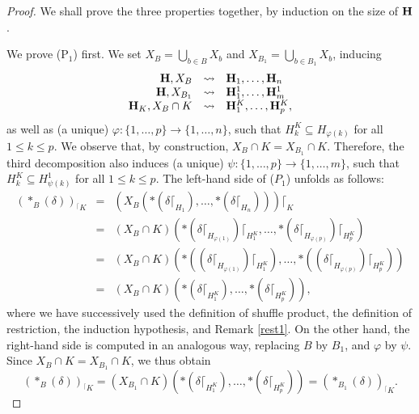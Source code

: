 \documentclass{article}
\theoremstyle{plain}
\theoremstyle{definition}
\newcommand{\inc}{\subseteq}
\newcommand{\Union}{\bigcup}
\newcommand{\set}[1]{\{#1\}}
\newcommand{\inter}{\cap}
\newcommand{\hyper}[1]{{\bf #1}}
\newcommand{\restrconstr}[2]{{#1}_{{}^\lceil {#2}}}
\begin{document}
\begin{proof} We shall prove   the three  properties   together, by induction on the size of ${\bf H}$.  

\smallskip

 We   prove  (P$_1$) first. We set $X_B=\Union_{b\in B}X_b$ and $X_{B_1}=\Union_{b\in B_1}X_b$, inducing
$$\begin{array}{rcl}

\hyper{H},X_B & \leadsto & \hyper{H}_1,\ldots,\hyper{H}_n\\ 
\hyper{H},X_{B_1} & \leadsto & \hyper{H}^1_1,\ldots,\hyper{H}^1_m \\
\hyper{H}_K,X_{B}\inter K & \leadsto &\hyper{H}_1^K,\ldots,\hyper{H}_p^K,
\end{array}$$
as well as (a unique) $\varphi:\set{1,\ldots,p}\rightarrow\set{1,\ldots,n}$, such that $H_k^K\inc H_{\varphi(k)}$ for all $1\leq k\leq p$. We observe that, by construction, $X_B\cap K=X_{B_1}\cap K$. Therefore, the third decomposition also induces (a unique) $\psi:\set{1,\ldots,p}\rightarrow\set{1,\ldots,m}$, such that $H_k^K\inc H^1_{\psi(k)}$ for all $1\leq k\leq p$. The left-hand side of ($P_1$) unfolds as follows:  
 $$\begin{array}{rcl}
\restrconstr{(\ast_B(\delta))}{K} & =&(X_ B(\ast(\delta\lceil_{H_1}),\dots,\ast(\delta\lceil_{H_n})))\lceil_{K} \\[0.1cm]
&=&(X_B\cap K)(\ast(\delta\lceil_{H_{\varphi(1)}})\lceil_{H^K_1}, \dots ,\ast(\delta\lceil_{H_{\varphi(p)}})\lceil_{H^K_p}) \\[0.1cm]
&=& (X_B\cap K) (\ast((\delta\lceil_{H_{\varphi(1)}})\lceil_{H^K_1}), \dots ,\ast((\delta\lceil_{H_{\varphi(p)}})\lceil_{H^K_p})) \\[0.1cm]
&=& (X_B\cap K)(\ast(\delta\lceil_{{H^K_1}}), \dots ,\ast(\delta\lceil_{{H^K_p}})), 
\end{array}$$
where we have successively used the definition of shuffle product, the definition of restriction, the induction hypothesis, and Remark \ref{rest1}. On the other hand, the right-hand side is computed in an analogous way, replacing $B$ by $B_1$, and $\varphi$ by $\psi$. Since $X_B\cap K=X_{B_1}\cap K$, we thus obtain $$\restrconstr{(\ast_B(\delta))}{K} =(X_{B_1}\cap K)(\ast(\delta\lceil_{{H^K_1}}), \dots ,\ast(\delta\lceil_{{H^K_p}}))=\restrconstr{(\ast_{B_1}(\delta))}{K}.$$
 
\smallskip
 

\end{proof}
\end{document}
